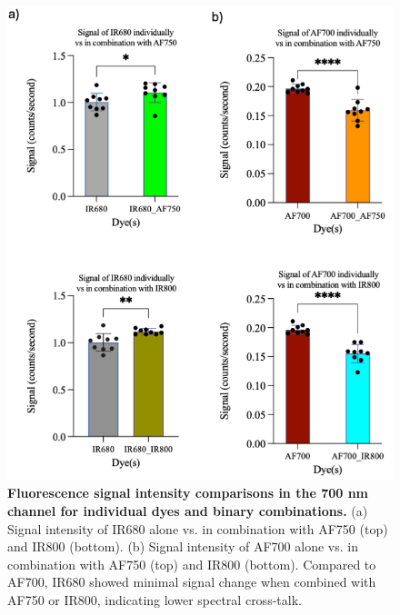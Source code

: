 \begin{figure}[H]
    \centering
    \begin{minipage}{\linewidth}
        \includegraphics[width=\linewidth]{figures/combo_700nm.png}
        \captionsetup{justification=raggedright, singlelinecheck=false}
        \caption[Combination experiments results in  700nm channel]{
            \textbf{Fluorescence signal intensity comparisons in the 700 nm channel for individual dyes and binary combinations.} 
            (a) Signal intensity of IR680 alone vs. in combination with AF750 (top) and IR800 (bottom). (b) Signal intensity of AF700 
            alone vs. in combination with AF750 (top) and IR800 (bottom). Compared to AF700, IR680 showed minimal signal change when 
            combined with AF750 or IR800, indicating lower spectral cross-talk.
        }
        \label{fig:combo_700}
    \end{minipage}
\end{figure}

